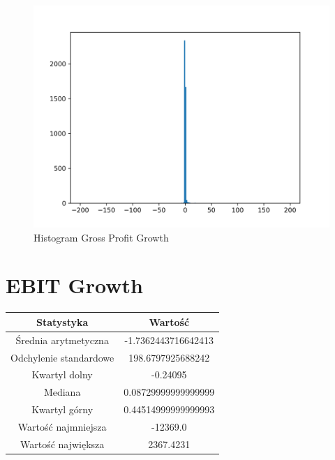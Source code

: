 \documentclass{article}
\begin{document}
\begin{figure}[h!]
    \includegraphics[width=\linewidth]{variables/Gross Profit Growth.png}
    \caption{Histogram Gross Profit Growth }
\end{figure}\section{ EBIT Growth }

\begin{center}
    \begin{tabular}{|c | c|} 
    \hline
    Statystyka & Wartość \\
    \hline\hline
    Średnia arytmetyczna & -1.7362443716642413 \\ 
    \hline
    Odchylenie standardowe & 198.6797925688242 \\
    \hline
    Kwartyl dolny & -0.24095 \\
    \hline
    Mediana & 0.08729999999999999 \\
    \hline
    Kwartyl górny & 0.44514999999999993 \\
    \hline
    Wartość najmniejsza & -12369.0 \\
    \hline
    Wartość największa & 2367.4231 \\
    \hline
   \end{tabular}
\end{center}
\end{document}
